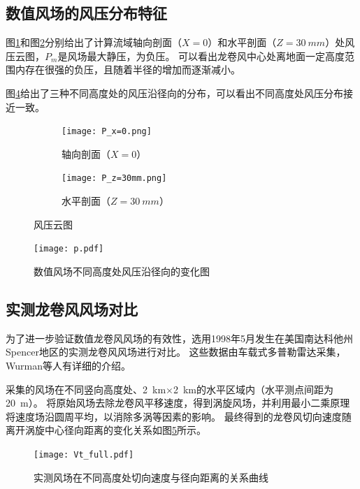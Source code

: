 \subsection{数值风场的风压分布特征}
图\ref{fig:P-x=0}和图\ref{fig:P-z=30mm}分别给出了计算流域轴向剖面（$X=0$）和水平剖面（$Z=\SI{30}{mm}$）处风压云图，$P_m$是风场最大静压，为负压。
可以看出龙卷风中心处离地面一定高度范围内存在很强的负压，且随着半径的增加而逐渐减小。

图\ref{fig:p}给出了三种不同高度处的风压沿径向的分布，可以看出不同高度处风压分布接近一致。

\begin{figure}[!htbp]
  \begin{subfigure}[b]{0.5\textwidth}
    \centering
    \texttt{[image: P\_x=0.png]}
    \caption{轴向剖面（$X=0$）}\label{fig:P-x=0}
  \end{subfigure}
  \begin{subfigure}[b]{0.5\textwidth}
    \centering
    \texttt{[image: P\_z=30mm.png]}
    \caption{水平剖面（$Z=\SI{30}{mm}$）}\label{fig:P-z=30mm}
  \end{subfigure}
  \caption{风压云图}\label{fig:p-contour}
\end{figure}

\begin{figure}[!htbp]
  \centering
  \texttt{[image: p.pdf]}
  \caption{数值风场不同高度处风压沿径向的变化图}
  \label{fig:p}
\end{figure}

\subsection{实测龙卷风风场对比}
为了进一步验证数值龙卷风风场的有效性，选用1998年5月发生在美国南达科他州Spencer地区的实测龙卷风风场进行对比。
这些数据由车载式多普勒雷达采集，Wurman等人有详细的介绍\cite{wurman2002multiple}\cite{alexander2005spencer}\cite{wurman2005spencer}。

采集的风场在不同竖向高度处、\SI{2}{km}$\times$\SI{2}{km}的水平区域内（水平测点间距为\SI{20}{m}）。
将原始风场去除龙卷风平移速度，得到涡旋风场，并利用最小二乘原理将速度场沿圆周平均，以消除多涡等因素的影响。
最终得到的龙卷风切向速度随离开涡旋中心径向距离的变化关系如图\ref{fig:Vt-full}所示。
\begin{figure}[!htbp]
  \centering
  \texttt{[image: Vt\_full.pdf]}
  \caption{实测风场在不同高度处切向速度与径向距离的关系曲线\cite{sarkar2005velocity}}
  \label{fig:Vt-full}
\end{figure}

